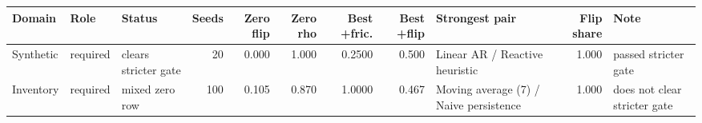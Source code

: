 \begin{tabularx}{\textwidth}{@{}l l l r r r r r >{\raggedright\arraybackslash}X r >{\raggedright\arraybackslash}X@{}}
\toprule
Domain & Role & Status & Seeds & Zero flip & Zero rho & Best +fric. & Best +flip & Strongest pair & Flip share & Note \\
\midrule
Synthetic & required & clears stricter gate & 20 & 0.000 & 1.000 & 0.2500 & 0.500 & Linear AR / Reactive heuristic & 1.000 & passed stricter gate \\
Inventory & required & mixed zero row & 100 & 0.105 & 0.870 & 1.0000 & 0.467 & Moving average (7) / Naive persistence & 1.000 & does not clear stricter gate \\
\bottomrule
\end{tabularx}
